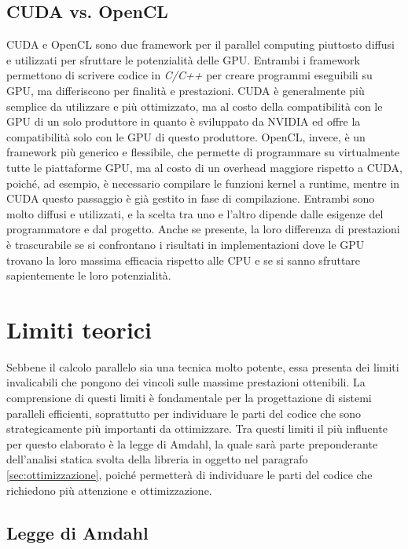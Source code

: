 \subsection{CUDA vs. OpenCL}
\label{subsec:cudavsopencl}

CUDA e OpenCL sono due framework per il parallel computing piuttosto diffusi e
utilizzati per sfruttare le potenzialità delle GPU. Entrambi i framework permettono
di scrivere codice in \textit{C/C++} per creare programmi eseguibili su GPU, ma differiscono
per finalità e prestazioni. CUDA è generalmente più semplice da utilizzare e più
ottimizzato, ma al costo della compatibilità con le GPU di un solo produttore in
quanto è sviluppato da NVIDIA ed offre la compatibilità solo con le GPU di questo
produttore. OpenCL, invece, è un framework più generico e flessibile, che permette
di programmare su virtualmente tutte le piattaforme GPU, ma al costo di un
overhead maggiore rispetto a CUDA, poiché, ad esempio, è necessario compilare le
funzioni kernel a runtime, mentre in CUDA questo passaggio è già gestito in fase
di compilazione. Entrambi sono molto diffusi e utilizzati, e la scelta tra uno e
l'altro dipende dalle esigenze del programmatore e dal progetto. Anche se presente,
la loro differenza di prestazioni è trascurabile se si confrontano i risultati
in implementazioni dove le GPU trovano la loro massima efficacia rispetto alle
CPU e se si sanno sfruttare sapientemente le loro potenzialità.

\section{Limiti teorici}
\label{sec:limititeorici}

Sebbene il calcolo parallelo sia una tecnica molto potente, essa presenta dei
limiti invalicabili che pongono dei vincoli sulle massime prestazioni ottenibili.
La comprensione di questi limiti è fondamentale per la progettazione di sistemi paralleli
efficienti, soprattutto per individuare le parti del codice che sono
strategicamente più importanti da ottimizzare. Tra questi limiti il più influente
per questo elaborato è la legge di Amdahl, la quale sarà parte preponderante
dell'analisi statica svolta della libreria in oggetto nel paragrafo
\ref{sec:ottimizzazione}, poiché permetterà di individuare le parti del codice che
richiedono più attenzione e ottimizzazione.

\subsection{Legge di Amdahl}
\label{sec:amdahl}

